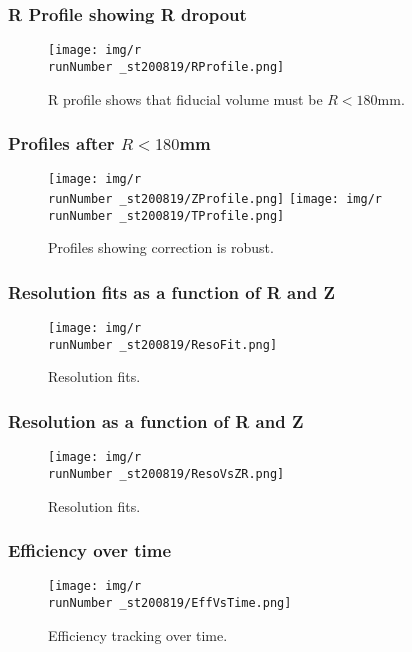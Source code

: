 \begin{frame}
\frametitle{R Profile showing R dropout}
\begin{figure}
  \begin{center}
      \texttt{[image: img/r\\runNumber \_st200819/RProfile.png]}
    \caption{R profile shows that fiducial volume must be $R < 180$mm.}
  \end{center}
\end{figure}
\end{frame}


\begin{frame}
\frametitle{Profiles after $R < 180$mm}
\begin{figure}
  \begin{center}
      \texttt{[image: img/r\\runNumber \_st200819/ZProfile.png]}
      \texttt{[image: img/r\\runNumber \_st200819/TProfile.png]}
    \caption{Profiles showing correction is robust.}
  \end{center}
\end{figure}
\end{frame}

\begin{frame}
\frametitle{Resolution fits as a function of R and Z}
\begin{figure}
  \begin{center}
      \texttt{[image: img/r\\runNumber \_st200819/ResoFit.png]}
    \caption{Resolution fits.}
  \end{center}
\end{figure}
\end{frame}

\begin{frame}
\frametitle{Resolution as a function of R and Z}
\begin{figure}
  \begin{center}
      \texttt{[image: img/r\\runNumber \_st200819/ResoVsZR.png]}
    \caption{Resolution fits.}
  \end{center}
\end{figure}
\end{frame}

\begin{frame}
\frametitle{Efficiency over time}
\begin{figure}
  \begin{center}
      \texttt{[image: img/r\\runNumber \_st200819/EffVsTime.png]}
    \caption{Efficiency tracking over time.}
  \end{center}
\end{figure}
\end{frame}

